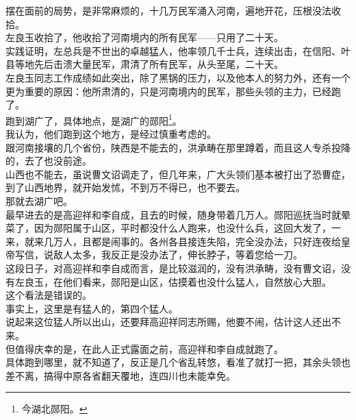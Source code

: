 \begin{multicols}{\theparacolNo}
摆在面前的局势，是非常麻烦的，十几万民军涌入河南，遍地开花，压根没法收拾。\\

左良玉收拾了，他收拾了河南境内的所有民军——只用了二十天。\\

实践证明，左总兵是不世出的卓越猛人，他率领几千士兵，连续出击，在信阳、叶县等地先后击溃大量民军，肃清了所有民军，从头至尾，二十天。\\

左良玉同志工作成绩如此突出，除了黑锅的压力，以及他本人的努力外，还有一个更为重要的原因：他所肃清的，只是河南境内的民军，那些头领的主力，已经跑了。\\

跑到湖广了，具体地点，是湖广的郧阳\footnote{今湖北郧阳。}。\\

我认为，他们跑到这个地方，是经过慎重考虑的。\\

跟河南接壤的几个省份，陕西是不能去的，洪承畴在那里蹲着，而且这人专杀投降的，去了也没前途。\\

山西也不能去，虽说曹文诏调走了，但几年来，广大头领们基本被打出了恐曹症，到了山西地界，就开始发怵，不到万不得已，也不要去。\\

那就去湖广吧。\\

最早进去的是高迎祥和李自成，且去的时候，随身带着几万人。郧阳巡抚当时就晕菜了，因为郧阳属于山区，平时都没什么人跑来，也没什么兵，这回大发了，一来，就来几万人，且都是闹事的。各州各县接连失陷，完全没办法，只好连夜给皇帝写信，说敌人太多，我反正是没办法了，伸长脖子，等着您给一刀。\\

这段日子，对高迎祥和李自成而言，是比较滋润的，没有洪承畴，没有曹文诏，没有左良玉，在他们看来，郧阳是山区，估摸着也没什么猛人，自然放心大胆。\\

这个看法是错误的。\\

事实上，这里是有猛人的，第四个猛人。\\

说起来这位猛人所以出山，还要拜高迎祥同志所赐，他要不闹，估计这人还出不来。\\

但值得庆幸的是，在此人正式露面之前，高迎祥和李自成就跑了。\\

具体跑到哪里，就不知道了，反正是几个省乱转悠，看准了就打一把，其余头领也差不离，搞得中原各省翻天覆地，连四川也未能幸免。\\


\end{multicols}
